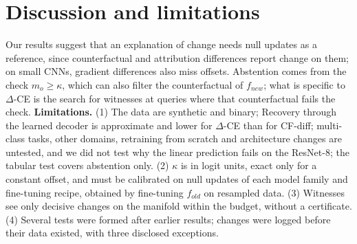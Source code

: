 \documentclass{esannV2}
\begin{document}
\section{Discussion and limitations}

Our results suggest that an explanation of change needs null updates as a reference, since counterfactual and attribution differences report change on them; on small CNNs, gradient differences also miss offsets. Abstention comes from the check $m_o\ge\kappa$, which can also filter the counterfactual of $f_{new}$; what is specific to $\Delta$-CE is the search for witnesses at queries where that counterfactual fails the check. \textbf{Limitations.} (1) The data are synthetic and binary; Recovery through the learned decoder is approximate and lower for $\Delta$-CE than for CF-diff; multi-class tasks, other domains, retraining from scratch and architecture changes are untested, and we did not test why the linear prediction fails on the ResNet-8; the tabular test covers abstention only. (2) $\kappa$ is in logit units, exact only for a constant offset, and must be calibrated on null updates of each model family and fine-tuning recipe, obtained by fine-tuning $f_{old}$ on resampled data. (3) Witnesses see only decisive changes on the manifold within the budget, without a certificate. (4) Several tests were formed after earlier results; changes were logged before their data existed, with three disclosed exceptions.
\end{document}
